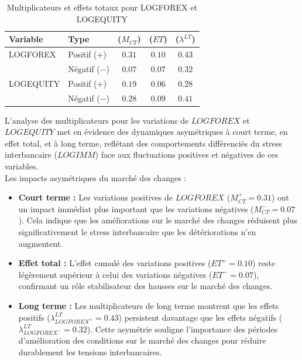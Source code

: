 \begin{table}[H]
\centering
\sffamily
\caption{Multiplicateurs et effets totaux pour LOGFOREX et LOGEQUITY}
\label{tab:multiplicateurs_effets}
\begin{tabular}{llccc}
\toprule
\textbf{Variable}   & \textbf{Type}          & \textbf{(\(M_{CT}\))} & \textbf{(\(ET\))} & \textbf{(\(\lambda^{LT}\))} \\ \midrule
{LOGFOREX} & Positif (\(+\))    & \( 0.31 \)                                  & \( 0.10 \)               & \( 0.43 \)                                           \\ 
                          & Négatif (\(-\))    & \( 0.07 \)                                  & \( 0.07 \)               & \( 0.32 \)                                           \\ \midrule
{LOGEQUITY} & Positif (\(+\))   & \( 0.19 \)                                  & \( 0.06 \)               & \( 0.28 \)                                           \\  
                          & Négatif (\(-\))    & \( 0.28 \)                                  & \( 0.09 \)               & \( 0.41 \)                                           \\ \bottomrule
\end{tabular}
\end{table}

L’analyse des multiplicateurs pour les variations de \(LOGFOREX\) et \(LOGEQUITY\) met en évidence des dynamiques asymétriques à court terme, en effet total, et à long terme, reflétant des comportements différenciés du stress interbancaire (\(LOGIMM\)) face aux fluctuations positives et négatives de ces variables.\\

Les impacts asymétriques du marché des changes :
\begin{itemize}
    \item \textbf{Court terme :} Les variations positives de \(LOGFOREX\) (\(M_{CT}^+ = 0.31\)) ont un impact immédiat plus important que les variations négatives (\(M_{CT}^- = 0.07\)). Cela indique que les améliorations sur le marché des changes réduisent plus significativement le stress interbancaire que les détériorations n’en augmentent.
    \item \textbf{Effet total :} L’effet cumulé des variations positives (\(ET^+ = 0.10\)) reste légèrement supérieur à celui des variations négatives (\(ET^- = 0.07\)), confirmant un rôle stabilisateur des hausses sur le marché des changes.
    \item \textbf{Long terme :} Les multiplicateurs de long terme montrent que les effets positifs (\(\lambda^{LT}_{LOGFOREX^+} = 0.43\)) persistent davantage que les effets négatifs (\(\lambda^{LT}_{LOGFOREX^-} = 0.32\)). Cette asymétrie souligne l’importance des périodes d’amélioration des conditions sur le marché des changes pour réduire durablement les tensions interbancaires.
\end{itemize}

